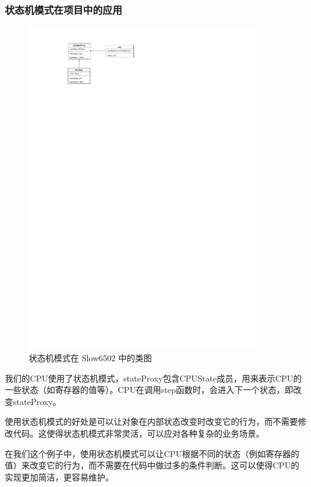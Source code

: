 \subsubsection{状态机模式在项目中的应用}

\begin{figure}[H]
    \centering
    \includegraphics[width=0.9\textwidth]{figures/State.pdf}
    \caption{状态机模式在 Slow6502 中的类图}
\end{figure}

我们的CPU使用了状态机模式，stateProxy包含CPUState成员，用来表示CPU的一些状态（如寄存器的值等）。CPU在调用step函数时，会进入下一个状态，即改变stateProxy。

使用状态机模式的好处是可以让对象在内部状态改变时改变它的行为，而不需要修改代码。这使得状态机模式非常灵活，可以应对各种复杂的业务场景。

在我们这个例子中，使用状态机模式可以让CPU根据不同的状态（例如寄存器的值）来改变它的行为，而不需要在代码中做过多的条件判断。这可以使得CPU的实现更加简洁，更容易维护。

  